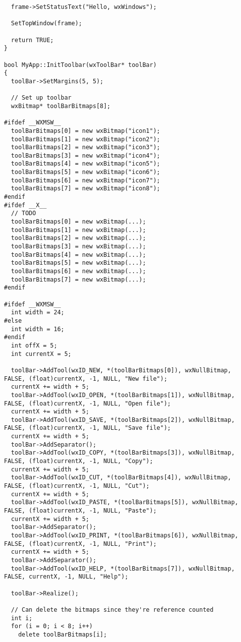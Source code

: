 {\begin{verbatim}
  frame->SetStatusText("Hello, wxWindows");
  
  SetTopWindow(frame);

  return TRUE;
}

bool MyApp::InitToolbar(wxToolBar* toolBar)
{
  toolBar->SetMargins(5, 5);

  // Set up toolbar
  wxBitmap* toolBarBitmaps[8];

#ifdef __WXMSW__
  toolBarBitmaps[0] = new wxBitmap("icon1");
  toolBarBitmaps[1] = new wxBitmap("icon2");
  toolBarBitmaps[2] = new wxBitmap("icon3");
  toolBarBitmaps[3] = new wxBitmap("icon4");
  toolBarBitmaps[4] = new wxBitmap("icon5");
  toolBarBitmaps[5] = new wxBitmap("icon6");
  toolBarBitmaps[6] = new wxBitmap("icon7");
  toolBarBitmaps[7] = new wxBitmap("icon8");
#endif
#ifdef __X__
  // TODO
  toolBarBitmaps[0] = new wxBitmap(...);
  toolBarBitmaps[1] = new wxBitmap(...);
  toolBarBitmaps[2] = new wxBitmap(...);
  toolBarBitmaps[3] = new wxBitmap(...);
  toolBarBitmaps[4] = new wxBitmap(...);
  toolBarBitmaps[5] = new wxBitmap(...);
  toolBarBitmaps[6] = new wxBitmap(...);
  toolBarBitmaps[7] = new wxBitmap(...);
#endif

#ifdef __WXMSW__
  int width = 24;
#else
  int width = 16;
#endif
  int offX = 5;
  int currentX = 5;

  toolBar->AddTool(wxID_NEW, *(toolBarBitmaps[0]), wxNullBitmap, FALSE, (float)currentX, -1, NULL, "New file");
  currentX += width + 5;
  toolBar->AddTool(wxID_OPEN, *(toolBarBitmaps[1]), wxNullBitmap, FALSE, (float)currentX, -1, NULL, "Open file");
  currentX += width + 5;
  toolBar->AddTool(wxID_SAVE, *(toolBarBitmaps[2]), wxNullBitmap, FALSE, (float)currentX, -1, NULL, "Save file");
  currentX += width + 5;
  toolBar->AddSeparator();
  toolBar->AddTool(wxID_COPY, *(toolBarBitmaps[3]), wxNullBitmap, FALSE, (float)currentX, -1, NULL, "Copy");
  currentX += width + 5;
  toolBar->AddTool(wxID_CUT, *(toolBarBitmaps[4]), wxNullBitmap, FALSE, (float)currentX, -1, NULL, "Cut");
  currentX += width + 5;
  toolBar->AddTool(wxID_PASTE, *(toolBarBitmaps[5]), wxNullBitmap, FALSE, (float)currentX, -1, NULL, "Paste");
  currentX += width + 5;
  toolBar->AddSeparator();
  toolBar->AddTool(wxID_PRINT, *(toolBarBitmaps[6]), wxNullBitmap, FALSE, (float)currentX, -1, NULL, "Print");
  currentX += width + 5;
  toolBar->AddSeparator();
  toolBar->AddTool(wxID_HELP, *(toolBarBitmaps[7]), wxNullBitmap, FALSE, currentX, -1, NULL, "Help");

  toolBar->Realize();

  // Can delete the bitmaps since they're reference counted
  int i;
  for (i = 0; i < 8; i++)
    delete toolBarBitmaps[i];


\end{verbatim}}

